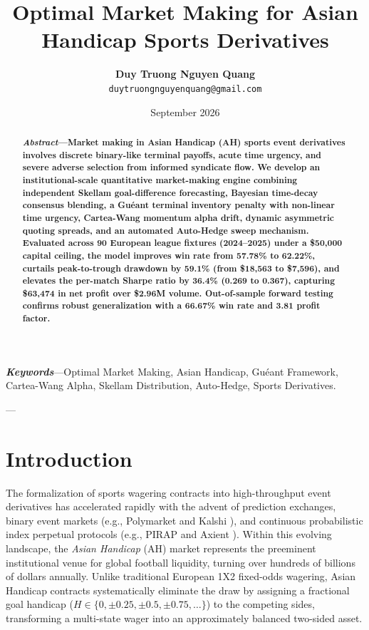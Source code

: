 \documentclass[10pt,twocolumn]{article}
\title{\textbf{\Large Optimal Market Making for Asian Handicap Sports Derivatives}}
\author{
    \textbf{Duy Truong Nguyen Quang} \\
    \texttt{\small duytruongnguyenquang@gmail.com}
}
\date{September 2026}
\begin{document}
\maketitle

\begin{abstract}
\textbf{\textit{Abstract}---Market making in Asian Handicap (AH) sports event derivatives involves discrete binary-like terminal payoffs, acute time urgency, and severe adverse selection from informed syndicate flow. We develop an institutional-scale quantitative market-making engine combining independent Skellam goal-difference forecasting, Bayesian time-decay consensus blending, a Guéant terminal inventory penalty with non-linear time urgency, Cartea-Wang momentum alpha drift, dynamic asymmetric quoting spreads, and an automated Auto-Hedge sweep mechanism. Evaluated across 90 European league fixtures (2024--2025) under a \$50,000 capital ceiling, the model improves win rate from 57.78\% to 62.22\%, curtails peak-to-trough drawdown by 59.1\% (from \$18,563 to \$7,596), and elevates the per-match Sharpe ratio by 36.4\% (0.269 to 0.367), capturing \$63,474 in net profit over \$2.96M volume. Out-of-sample forward testing confirms robust generalization with a 66.67\% win rate and 3.81 profit factor.}
\end{abstract}

\noindent\textbf{\textit{Keywords}}---Optimal Market Making, Asian Handicap, Guéant Framework, Cartea-Wang Alpha, Skellam Distribution, Auto-Hedge, Sports Derivatives.

---

\section{Introduction}
\label{sec:intro}

The formalization of sports wagering contracts into high-throughput event derivatives has accelerated rapidly with the advent of prediction exchanges, binary event markets (e.g., Polymarket and Kalshi \cite{7}), and continuous probabilistic index perpetual protocols (e.g., PIRAP \cite{8} and Axient \cite{9}). Within this evolving landscape, the \textit{Asian Handicap} (AH) market represents the preeminent institutional venue for global football liquidity, turning over hundreds of billions of dollars annually. Unlike traditional European 1X2 fixed-odds wagering, Asian Handicap contracts systematically eliminate the draw by assigning a fractional goal handicap ($H \in \{0, \pm 0.25, \pm 0.5, \pm 0.75, \dots\}$) to the competing sides, transforming a multi-state wager into an approximately balanced two-sided asset.
\end{document}
